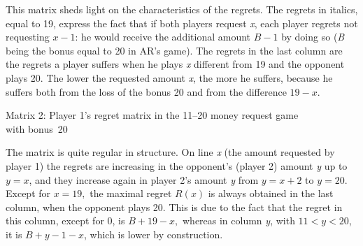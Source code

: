 \begin{Article}
\begin{refsection}[Umbhauer]
This matrix sheds light on the characteristics of the regrets. The
regrets in italics, equal to 19, express the fact that if both players
request \emph{x}, each player regrets not requesting \(x - 1\): he would
receive the additional amount \(B - 1\) by doing so (\emph{B} being the
bonus equal to 20 in AR's game). The regrets in the last column are the
regrets a player suffers when he plays \emph{x} different from 19 and
the opponent plays 20. The lower the requested amount \emph{x}, the more
he suffers, because he suffers both from the loss of the bonus 20 and
from the difference \(19 - x\).

\begin{table}[h!]
\centering
Matrix 2: Player 1's regret matrix in the 11--20 money request game\\ with bonus~20 \par
\vspace{0.2cm}
\label{matx2}
\end{table}


The matrix is quite regular in structure. On line \emph{x} (the amount
requested by player 1) the regrets are increasing in the opponent's
(player 2) amount \emph{y} up to \(y = x\), and they increase again in
player 2's amount \emph{y} from \(y = x + 2\) to \(y = 20\). Except for
\(x = 19,\) the maximal regret \(R(x)\) is always obtained in the last
column, when the opponent plays 20. This is due to the fact that the
regret in this column, except for 0, is \(B + 19 - x,\) whereas in
column \emph{y}, with \(11 < y < 20\), it is \(B + y - 1 - x\), which is
lower by construction.


\end{refsection}
\end{Article}
